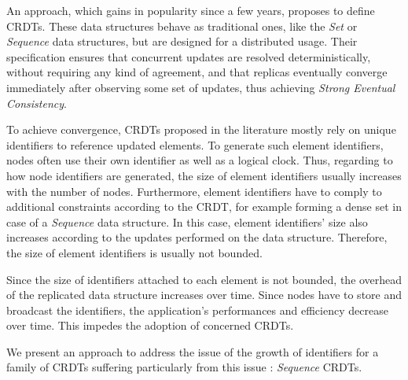 \documentclass{article}
\begin{document}
An approach, which gains in popularity since a few years, proposes to define \acfp{CRDT}.
These data structures behave as traditional ones, like the \emph{Set} or \emph{Sequence} data structures, but are designed for a distributed usage.
Their specification ensures that concurrent updates are resolved deterministically, without requiring any kind of agreement, and that replicas eventually converge immediately after observing some set of updates,
thus achieving \emph{Strong Eventual Consistency}.

To achieve convergence, \acp{CRDT} proposed in the literature mostly rely on unique identifiers to reference updated elements.
To generate such element identifiers, nodes often use their own identifier as well as a logical clock.
Thus, regarding to how node identifiers are generated, the size of element identifiers usually increases with the number of nodes.
Furthermore, element identifiers have to comply to additional constraints according to the \ac{CRDT}, for example forming a dense set in case of a \emph{Sequence} data structure.
In this case, element identifiers' size also increases according to the updates performed on the data structure.
Therefore, the size of element identifiers is usually not bounded.

Since the size of identifiers attached to each element is not bounded, the overhead of the replicated data structure increases over time.
Since nodes have to store and broadcast the identifiers, the application's performances and efficiency decrease over time.
This impedes the adoption of concerned \acp{CRDT}.

We present an approach to address the issue of the growth of identifiers for a family of \acp{CRDT} suffering particularly from this issue : \emph{Sequence} \acp{CRDT}.


\end{document}
